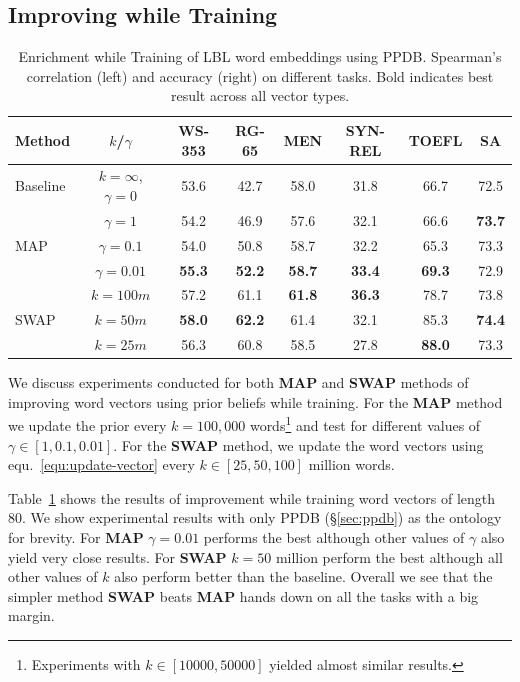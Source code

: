 \documentclass[11pt]{article}
\begin{document}
\subsection{Improving while Training}
\label{sec:improve-tr}

\begin{table}[!tbh]
  \centering
  \small
  \begin{tabular}{l|c||c|c|c||c|c||c}
Method & $k$/$\gamma$ & WS-353 & RG-65 & MEN & SYN-REL & TOEFL & SA \\
\hline
Baseline & $k=\infty$, $\gamma=0$ & 53.6 & 42.7 & 58.0 & 31.8 & 66.7 & 72.5 \\
\hline
\multirow{3}{*}{MAP} & $\gamma=1$ & 54.2 & 46.9 & 57.6 & 32.1 & 66.6 & \textbf{73.7}\\
 & $\gamma=0.1$ & 54.0 & 50.8 & 58.7 & 32.2 & 65.3 & 73.3\\
 & $\gamma=0.01$ & \textbf{55.3} & \textbf{52.2} & \textbf{58.7} & \textbf{33.4} & \textbf{69.3} & 72.9\\
\hline\hline
\multirow{3}{*}{SWAP} & $k=100m$ & 57.2 & 61.1 & \textbf{61.8} & \textbf{36.3} & 78.7 & 73.8\\
 & $k=50m$ & \textbf{58.0} & \textbf{62.2} & 61.4 & 32.1 & 85.3 & \textbf{74.4} \\
 & $k=25m$ & 56.3 & 60.8 & 58.5 & 27.8 & \textbf{88.0} & 73.3\\
\end{tabular}
   \caption{Enrichment while Training of LBL word embeddings using PPDB.
   Spearman's correlation (left) and accuracy (right) on different tasks. Bold indicates 
   best result across all vector types.}
  \label{tab:lbl-tr}
\end{table}

We discuss experiments conducted for both \textbf{MAP} and \textbf{SWAP} methods of
improving word vectors using prior beliefs while training. For the \textbf{MAP} method
we update the prior every $k=100,000$ words\footnote{Experiments with $k \in [10000, 50000]$ 
yielded almost similar results.} and test for different values of $\gamma \in [1, 0.1, 0.01]$.
For the \textbf{SWAP} method, we update the word vectors using equ.~\ref{equ:update-vector}
every $k \in [25, 50, 100]$ million words. 

Table~\ref{tab:lbl-tr} shows the results of improvement while training word vectors of length $80$. 
We show experimental results 
with only PPDB (\S\ref{sec:ppdb}) as the ontology for brevity. For \textbf{MAP}
$\gamma = 0.01$ performs the best although other values of $\gamma$ also yield very close 
results. For \textbf{SWAP} $k=50$ million perform the best although all other values of $k$
also perform better than the baseline. Overall we see that the simpler method \textbf{SWAP}
beats \textbf{MAP} hands down on all the tasks with a big margin.
\end{document}
